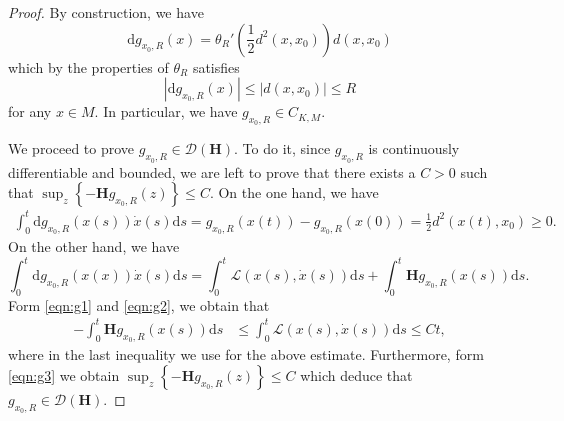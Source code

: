 \documentclass[a4paper]{article}
\newcommand{\dd}{ \mathrm{d}}
\numberwithin{equation}{section}
\theoremstyle{definition}
\begin{document}
\begin{proof}
    By construction, we have
    \begin{equation*}
        \dd g_{x_0,R}(x) = \theta_R'\left(\frac{1}{2}d^2(x,x_0)\right) d(x,x_0)
    \end{equation*}
    which by the properties of $\theta_R$ satisfies
    \begin{equation*}
        | \dd g_{x_0,R}(x) | \leq |d(x,x_0)| \leq R
    \end{equation*}
    for any $x \in M$. In particular, we have $g_{x_0,R} \in C_{K,M}$.
    \par
    We proceed to prove $g_{x_0,R}\in \mathcal{D}(\mathbf{H})$. To do it, since  $g_{x_0,R}$ is continuously differentiable and bounded, we are left to prove that there exists a $C>0$ such that $\sup_{z}\left\{-\mathbf{H}g_{x_0,R}(z)\right\}\leq C$.
    On the one hand, we have
    \begin{equation}\label{eqn:g1}
    \begin{split}
        \int^t_0\dd g_{x_0,R}(x(s))\dot{x}(s)\dd s=g_{x_0,R}(x(t))-g_{x_0,R}(x(0))=\frac{1}{2}d^2(x(t),x_0)\geq 0.
    \end{split}
    \end{equation}
    On the other hand, we have
\begin{equation}\label{eqn:g2}
        \int^t_0\dd g_{x_0,R}(x(x))\dot{x}(s)\dd s=\int^t_0\mathcal{L}(x(s),\dot{x}(s))\dd s+\int^t_0\mathbf{H}g_{x_0,R}(x(s))\dd s. 
    \end{equation}
    Form \eqref{eqn:g1} and \eqref{eqn:g2}, we obtain that
\begin{equation}\label{eqn:g3}
    \begin{split}
        -\int^t_0\mathbf{H}g_{x_0,R}(x(s))\dd s &\leq\int^t_0\mathcal{L}(x(s),\dot{x}(s))\dd s\leq Ct,
    \end{split}
    \end{equation}
 where in the last inequality we use   for the above estimate. Furthermore, form \eqref{eqn:g3}  we obtain $\sup_{z}\left\{-\mathbf{H}g_{x_0,R}(z)\right\}\leq C$ which deduce that $g_{x_0,R}\in \mathcal{D}(\mathbf{H})$.
\end{proof}
\end{document}
